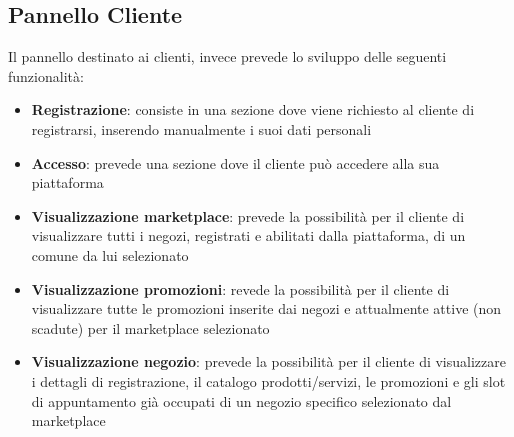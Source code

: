 \subsection{Pannello Cliente} Il pannello destinato ai clienti, invece prevede lo sviluppo delle seguenti funzionalità:
\begin{itemize}
    \item \textbf{Registrazione}: consiste in una sezione dove viene richiesto al cliente di registrarsi, inserendo manualmente i suoi dati personali
    \item \textbf{Accesso}: prevede una sezione dove il cliente può accedere alla sua piattaforma
    \item \textbf{Visualizzazione marketplace}: prevede la possibilità per il cliente di visualizzare tutti i negozi, registrati e abilitati dalla piattaforma, di un comune da lui selezionato
    \item \textbf{Visualizzazione promozioni}: revede la possibilità per il cliente di visualizzare tutte le promozioni inserite dai negozi  e attualmente attive (non scadute) per il marketplace selezionato
    \item \textbf{Visualizzazione negozio}: prevede la possibilità per il cliente di visualizzare i dettagli di registrazione, il catalogo prodotti/servizi, le promozioni e gli slot di appuntamento già occupati di un negozio specifico selezionato dal marketplace
    
\end{itemize}